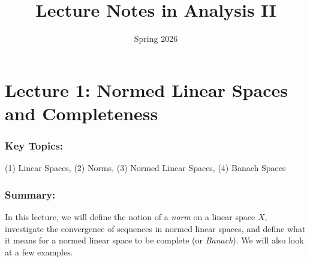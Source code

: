 \documentclass{article}
\title{Lecture Notes in Analysis II}
\author{\me}
\date{Spring 2026}
\begin{document}
	\maketitle
	\fullline 
	\tableofcontents
	\halfline 
	\newpage 
	
	
\section{Lecture 1: Normed Linear Spaces and Completeness}
\subsubsection{Key Topics:}
(1) Linear Spaces, (2) Norms, (3) Normed Linear Spaces, (4) Banach Spaces
\subsubsection{Summary:}
In this lecture, we will define the notion of a \textit{norm} on a linear space $X$, investigate the convergence of sequences in normed linear spaces, and define what it means for a normed linear space to be complete (or \textit{Banach}). We will also look at a few examples. 
\end{document}
